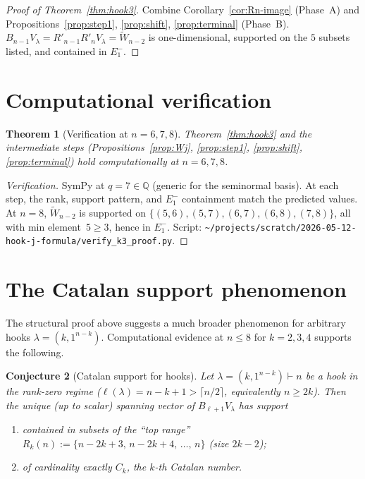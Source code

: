 \documentclass[11pt]{article}
\newtheorem{theorem}{Theorem}
\newtheorem{conjecture}[theorem]{Conjecture}
\theoremstyle{definition}
\begin{document}
\begin{proof}[Proof of Theorem~\ref{thm:hook3}]
Combine Corollary~\ref{cor:Rn-image} (Phase~A) and
Propositions~\ref{prop:step1}, \ref{prop:shift}, \ref{prop:terminal}
(Phase~B).  $B_{n-1}V_\lambda=R'_{n-1}R'_n V_\lambda=\widetilde W_{n-2}$
is one-dimensional, supported on the $5$ subsets listed, and contained
in $E_1^-$.
\end{proof}

\section{Computational verification}

\begin{theorem}[Verification at $n=6,7,8$]\label{thm:verify}
Theorem~\ref{thm:hook3} and the intermediate steps
(Propositions~\ref{prop:Wj}, \ref{prop:step1}, \ref{prop:shift},
\ref{prop:terminal}) hold computationally at $n=6,7,8$.
\end{theorem}

\begin{proof}[Verification]
SymPy at $q=7\in\mathbb{Q}$ (generic for the seminormal basis).  At
each step, the rank, support pattern, and $E_1^-$ containment match
the predicted values.  At $n=8$, $\widetilde W_{n-2}$ is supported on
$\{(5,6),(5,7),(6,7),(6,8),(7,8)\}$, all with min element~$5\ge 3$,
hence in $E_1^-$.  Script:
\texttt{\textasciitilde/projects/scratch/2026-05-12-hook-j-formula/verify\_k3\_proof.py}.
\end{proof}

\section{The Catalan support phenomenon}

The structural proof above suggests a much broader phenomenon for
arbitrary hooks $\lambda=(k,1^{n-k})$.  Computational evidence at
$n\le 8$ for $k=2,3,4$ supports the following.

\begin{conjecture}[Catalan support for hooks]\label{conj:catalan}
Let $\lambda=(k,1^{n-k})\vdash n$ be a hook in the rank-zero regime
($\ell(\lambda)=n-k+1>\lceil n/2\rceil$, equivalently $n\ge 2k$).
Then the unique (up to scalar) spanning vector of
$B_{\ell+1}V_\lambda$ has support
\begin{enumerate}[leftmargin=2em,topsep=0.3em,itemsep=0.2em,label=(\arabic*)]
\item contained in subsets of the ``top range''
$R_k(n) := \{n-2k+3,\,n-2k+4,\,\ldots,\,n\}$ (size $2k-2$);
\item of cardinality exactly $C_k$, the $k$-th Catalan number.
\end{enumerate}
\end{conjecture}
\end{document}
